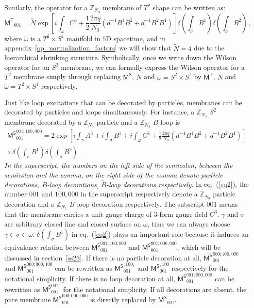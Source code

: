 \documentclass[11pt,nofootinbib,preprint]{revtex4-1}
\begin{document}
Similarly, the operator for  a $\mathbb{Z} _{N_3}$ membrane of $T^2$ shape can be written as:
\begin{equation}
	\mathsf{M^T}_{001}=\tilde{N}\exp \left[ i\int_{\tilde{\omega}}{C^3+\frac{1}{2}\frac{2\pi q}{N_3}\left( d^{-1}B^1B^2+d^{-1}B^2B^1 \right)} \right] \delta \left( \int_{\sigma}{B^1} \right) \delta \left( \int_{\sigma}{B^2} \right) \,,
\end{equation}
where $\tilde{\omega}$ is a $T^2\times S^1$ manifold in $5$D spacetime, and in appendix~\ref{ap_normalization_factors} we will show that  $\tilde{N}=4$ due to the hierarchical shrinking structure. Symbolically, once we write down the Wilson operator for an $S^2$ membrane, we can formally express  the Wilson operator for a $T^2$ membrane  simply through replacing $\mathsf{M^S}$, $N$ and $\omega=S^2\times S^1$ by $\mathsf{M^T}$, $\tilde{N}$ and $\tilde{\omega}=T^2\times S^1$ respectively. 

Just like loop excitations that can be decorated by particles, membranes can   be decorated by particles and loops simultaneously. For instance, a $\mathbb{Z} _{N_3}$ $S^2$ membrane decorated by a $\mathbb{Z} _{N_3}$ particle and a $\mathbb{Z} _{N_1}$ $B$-loop is
\begin{multline}
	\mathsf{M^S}_{001}^{001;100,000}=2\exp \left[ i\int_{\gamma}{A^3}+i\int_{\sigma}{B^1}+i\int_{\omega}{C^3+\frac{1}{2}\frac{2\pi q}{N_3}\left( d^{-1}B^1B^2+d^{-1}B^2B^1 \right)} \right]\\ \times\delta \left( \int_{\sigma}{B^1} \right) \delta \left( \int_{\sigma}{B^2} \right) \,.
	\label{eq2}
\end{multline}
\textit{In the superscript, the numbers on the left side of the semicolon, between the semicolon and the comma, on the right side of the comma denote particle decorations, $B$-loop decorations, $\tilde{B}$-loop decorations respectively}. In eq.~(\ref{eq2}), the number  $001$ and $100,000$ in the superscript respectively denote a $\mathbb{Z} _{N_3}$ particle  decoration and a $\mathbb{Z} _{N_1}$ $B$-loop decoration respectively. The subscript $001$ means that the membrane carries a unit gauge charge of $3$-form gauge field $C^3$. $\gamma$ and $\sigma$ are arbitrary closed line and closed surface on $\omega$, thus we can always choose $\gamma\in\sigma\in\omega$. $\delta \left( \int_{\sigma}{B^1} \right)$ in eq.~(\ref{eq2}) plays an important role because it induces an equivalence relation between $\mathsf{M^S}_{001}^{001;100,000}$ and $\mathsf{M^S}_{001}^{001;000,000}$, which will be  discussed in section~\ref{ss23}. If there is no particle decoration at all, $\mathsf{M^S}_{001}^{000;100,000}$ and $\mathsf{M^S}_{001}^{000;000,100}$ can be  rewritten as $\mathsf{M^S}_{001}^{;100,}$ and $\mathsf{M^S}_{001}^{,100}$ respectively for the notational simplicity.  If there is no loop decoration at all, $\mathsf{M^S}_{001}^{001;000,000}$ can be  rewritten as $\mathsf{M^S}_{001}^{001;}$ for the notational simplicity. If all decorations are absent, the pure membrane $\mathsf{M^S}_{001}^{000;000,000}$ is directly replaced by $\mathsf{M^S}_{001}$.
\end{document}
